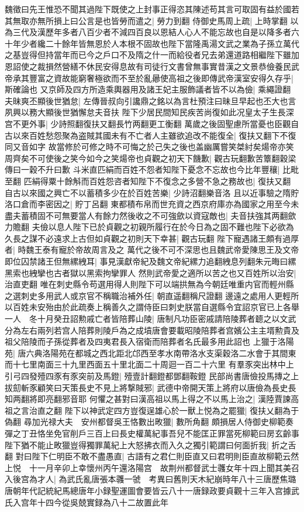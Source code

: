 魏徵曰先王惟恐不聞其過陛下既使之上封事正得恣其陳述苟其言可取固有益於國若其無取亦無所損上曰公言是也皆勞而遣之|{
	勞力到翻}
侍御史馬周上疏|{
	上時掌翻}
以為三代及漢歷年多者八百少者不減四百良以恩結人心人不能忘故也自是以降多者六十年少者纔二十餘年皆無恩於人本根不固故也陛下當隆禹湯文武之業為子孫立萬代之基豈得但持當年而已今之戶口不及隋之什一而給役者兄去弟還道路相繼陛下雖加恩詔使之裁損然營繕不休民安得息故有司徒行文書曾無事實昔漢之文景恭儉養民武帝承其豐富之資故能窮奢極欲而不至於亂曏使高祖之後即傳武帝漢室安得久存乎|{
	斯確論也}
又京師及四方所造乘輿器用及諸王妃主服飾議者皆不以為儉|{
	乘繩證翻}
夫昧爽丕顯後世猶怠|{
	左傳晉叔向引讒鼎之銘以為言杜預注曰昧旦早起也丕大也言夙興以務大顯後世猶懈怠夫音扶}
陛下少居民間知民疾苦尚復如此况皇太子生長深宫不更外事|{
	少詩照翻復扶又翻長竹两翻更工衡翻}
萬歲之後固聖慮所當憂也臣觀自古以來百姓愁怨聚為盗賊其國未有不亡者人主雖欲追改不能復全|{
	復扶又翻下不復同又音如字}
故當修於可修之時不可悔之於己失之後也盖幽厲嘗笑桀紂矣煬帝亦笑周齊矣不可使後之笑今如今之笑煬帝也貞觀之初天下饑歉|{
	觀古玩翻歉苦簟翻穀梁傳曰一穀不升曰歉}
斗米直匹絹而百姓不怨者知陛下憂念不忘故也今比年豐穰|{
	比毗至翻}
匹絹得粟十餘斛而百姓怨咨者知陛下不復念之多營不急之務故也|{
	復扶又翻}
自古以來國之興亡不以蓄積多少在於百姓苦樂|{
	少詩沼翻樂音洛}
且以近事驗之隋貯洛口倉而李密因之|{
	貯丁呂翻}
東都積布帛而世充資之西京府庫亦為國家之用至今未盡夫蓄積固不可無要當人有餘力然後收之不可強歛以資寇敵也|{
	夫音扶強其两翻歛力贍翻}
夫儉以息人陛下已於貞觀之初親所履行在於今日為之固不難也陛下必欲為久長之謀不必遠求上古但如貞觀之初則天下幸甚|{
	觀古玩翻}
陛下寵遇諸王頗有過厚者|{
	時魏王泰有寵於帝故周言及之}
萬代之後不可不深思也且魏武帝愛陳思王及文帝即位囚禁諸王但無縲絏耳|{
	事見漢獻帝紀及魏文帝紀縲力追翻絏息列翻朱元晦曰縲黑索也絏攣也古者獄以黑索拘攣罪人}
然則武帝愛之適所以苦之也又百姓所以治安|{
	治直吏翻}
唯在刺史縣令苟選用得人則陛下可以端拱無為今朝廷唯重内官而輕州縣之選刺史多用武人或京官不稱職治補外任|{
	朝直遥翻稱尺證翻}
邊遠之處用人更輕所以百姓未安殆由於此疏奏上稱善久之謂侍臣曰刺史朕當自選縣令宜詔京官已上各舉一人　冬十月癸丑詔勲戚亡者皆陪葬山陵|{
	唐制凡功臣密戚請陪陵葬者聼之以文武分為左右兩列若宫人陪葬則陵戶為之成墳唐會要載昭陵陪葬者宫嬪公主主壻勲貴及祖父陪陵而子孫從葬者及四夷君長入宿衛而陪葬者名氏最多用此詔也}
上獵于洛陽苑|{
	唐六典洛陽苑在都城之西北距北邙西至孝水南帶洛水支渠穀洛二水會于其間東而十七里南面三十九里西面五十里北面二十周迴一百二十六里}
有羣豕突出林中上引弓四發殪四豕有豕突前及馬鐙|{
	殪壹計翻鐙都鄧翻鞍鐙}
民部尚書唐儉投馬摶之上拔劎斬豕顧笑曰天策長史不見上將撃賊邪|{
	武德中帝開天策上將府以唐儉為長史長知两翻將即亮翻邪音耶}
何懼之甚對曰漢高祖以馬上得之不以馬上治之|{
	漢陸賈諫高祖之言治直之翻}
陛下以神武定四方豈復逞雄心於一獸上悦為之罷獵|{
	復扶乂翻為于偽翻}
尋加光禄大夫　安州都督吳王恪數出畋獵|{
	數所角翻}
頗損居人侍御史柳範奏彈之丁丑恪坐免官削戶三百上曰長史權萬紀事吾兒不能匡正罪當死柳範曰房玄齡事陛下猶不能止畋獵豈得獨罪萬紀上大怒拂衣而入久之獨引範謂曰何面折我|{
	折之舌翻}
對曰陛下仁明臣不敢不盡愚直|{
	古語有之君仁則臣直又曰君明則臣直故柳範云然}
上悦　十一月辛卯上幸懷州丙午還洛陽宫　故荆州都督武士彠女年十四上聞其美召入後宫為才人|{
	為武氏亂唐張本彠一虢　考異曰舊則天木紀崩時年八十三唐歷焦璐唐朝年代記統紀馬總唐年小録聖運圖會要皆云八十一唐録政要貞觀十三年入宫據武氏入宫年十四今從吳兢實録為八十二故置此年}


